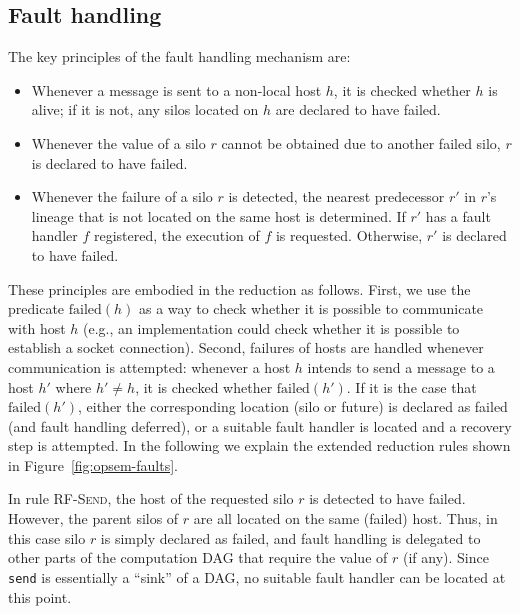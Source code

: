 \documentclass[preprint]{sigplanconf}
\theoremstyle{definition}
\theoremstyle{definition}
\begin{document}
\subsection{Fault handling}
\label{sec:faults-opsem}
The key principles of the fault handling mechanism are:
\begin{itemize}
\item Whenever a message is sent to a non-local host $h$, it is checked whether
  $h$ is alive; if it is not, any silos located on $h$ are declared to have
  failed.
\item Whenever the value of a silo $r$ cannot be obtained due to another failed
  silo, $r$ is declared to have failed.
\item Whenever the failure of a silo $r$ is detected, the nearest predecessor
  $r'$ in $r$'s lineage that is not located on the same host is determined. If
  $r'$ has a fault handler $f$ registered, the execution of $f$ is requested.
  Otherwise, $r'$ is declared to have failed.
\end{itemize}


These principles are embodied in the reduction as follows. First, we use the
predicate $\text{failed}(h)$ as a way to check whether it is possible to
communicate with host $h$ (e.g., an implementation could check whether it is
possible to establish a socket connection). Second, failures of hosts are
handled whenever communication is attempted: whenever a host $h$ intends to
send a message to a host $h'$ where $h' \neq h$, it is checked whether
$\text{failed}(h')$. If it is the case that $\text{failed}(h')$, either the
corresponding location (silo or future) is declared as failed (and fault
handling deferred), or a suitable fault handler is located and a recovery step
is attempted. In the following we explain the extended reduction rules shown in
Figure~\ref{fig:opsem-faults}.

In rule \textsc{RF-Send}, the host of the requested silo $r$ is detected to
have failed. However, the parent silos of $r$ are all located on the same
(failed) host. Thus, in this case silo $r$ is simply declared as failed, and
fault handling is delegated to other parts of the computation DAG that require
the value of $r$ (if any). Since \texttt{send} is essentially a ``sink'' of a
DAG, no suitable fault handler can be located at this point.
\end{document}
